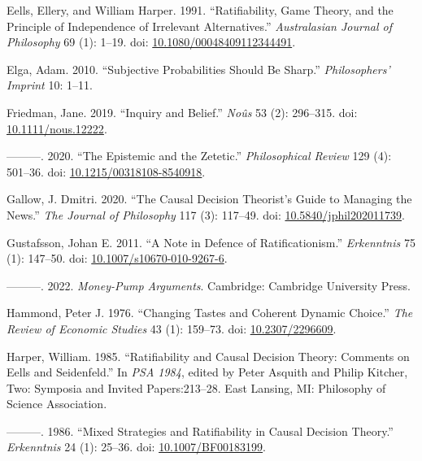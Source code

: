 \documentclass[
  10pt,
  letterpaper,
  DIV=11,
  numbers=noendperiod,
  twoside]{scrartcl}
\newlength{\cslhangindent}
\newenvironment{CSLReferences}[2] %
 {\begin{list}{}{%
  \setlength{\itemindent}{0pt}
  \setlength{\leftmargin}{0pt}
  \setlength{\parsep}{0pt}
  \ifodd #1
   \setlength{\leftmargin}{\cslhangindent}
   \setlength{\itemindent}{-1\cslhangindent}
  \fi
  \setlength{\itemsep}{#2\baselineskip}}}
 {\end{list}}
\begin{document}
\begin{CSLReferences}{1}{0}
Eells, Ellery, and William Harper. 1991. {``Ratifiability, Game Theory,
and the Principle of Independence of Irrelevant Alternatives.''}
\emph{Australasian Journal of Philosophy} 69 (1): 1--19. doi:
\href{https://doi.org/10.1080/00048409112344491}{10.1080/00048409112344491}.

Elga, Adam. 2010. {``Subjective Probabilities Should Be Sharp.''}
\emph{Philosophers' Imprint} 10: 1--11.

Friedman, Jane. 2019. {``Inquiry and Belief.''} \emph{No{û}s} 53 (2):
296--315. doi:
\href{https://doi.org/10.1111/nous.12222}{10.1111/nous.12222}.

---------. 2020. {``The Epistemic and the Zetetic.''}
\emph{Philosophical Review} 129 (4): 501--36. doi:
\href{https://doi.org/10.1215/00318108-8540918}{10.1215/00318108-8540918}.

Gallow, J. Dmitri. 2020. {``The Causal Decision Theorist's Guide to
Managing the News.''} \emph{The Journal of Philosophy} 117 (3): 117--49.
doi:
\href{https://doi.org/10.5840/jphil202011739}{10.5840/jphil202011739}.

Gustafsson, Johan E. 2011. {``A Note in Defence of Ratificationism.''}
\emph{Erkenntnis} 75 (1): 147--50. doi:
\href{https://doi.org/10.1007/s10670-010-9267-6}{10.1007/s10670-010-9267-6}.

---------. 2022. \emph{Money-Pump Arguments}. Cambridge: Cambridge
University Press.

Hammond, Peter J. 1976. {``Changing Tastes and Coherent Dynamic
Choice.''} \emph{The Review of Economic Studies} 43 (1): 159--73. doi:
\href{https://doi.org/10.2307/2296609}{10.2307/2296609}.

Harper, William. 1985. {``Ratifiability and Causal Decision Theory:
Comments on Eells and Seidenfeld.''} In \emph{PSA 1984}, edited by Peter
Asquith and Philip Kitcher, Two: Symposia and Invited Papers:213--28.
East Lansing, MI: Philosophy of Science Association.

---------. 1986. {``Mixed Strategies and Ratifiability in Causal
Decision Theory.''} \emph{Erkenntnis} 24 (1): 25--36. doi:
\href{https://doi.org/10.1007/BF00183199}{10.1007/BF00183199}.


\end{CSLReferences}
\end{document}
